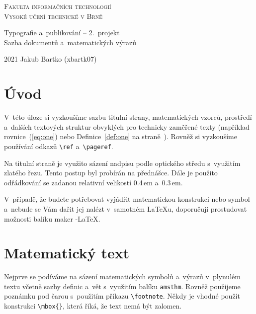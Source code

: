 \documentclass[a4paper, 11pt, twocolumn]{article}
\begin{document}
\begin{titlepage}

\begin{center}
\Huge
\textsc{Fakulta informačních technologií \\
Vysoké učení technické v Brně} \\

\LARGE
Typografie a~publikování -- 2.~projekt \\
Sazba dokumentů a~matematických výrazů \\
\end{center}

{\Large 2021 \hfill
Jakub Bartko (xbartk07)}
\end{titlepage}

\section*{Úvod}
V~této úloze si vyzkoušíme sazbu titulní strany, matematických vzorců, prostředí a~dalších textových struktur obvyklých pro technicky zaměřené texty (například rovnice~(\ref{eq:one}) nebo Definice~\ref{def:one} na straně~\pageref{def:one}). Rovněž si vyzkoušíme používání odkazů \verb|\ref| a~\verb|\pageref|.

Na titulní straně je využito sázení nadpisu podle optického středu s~využitím zlatého řezu. Tento postup byl probírán na přednášce. Dále je použito odřádkování se zadanou relativní velikostí 0.4\,em a~0.3\,em.

V~případě, že budete potřebovat vyjádřit matematickou konstrukci nebo symbol a~nebude se Vám dařit jej nalézt v~samotném \LaTeX u, doporučuji prostudovat možnosti balíku maker \AmS-\LaTeX.

\section{Matematický text}
Nejprve se podíváme na sázení matematických symbolů a~výrazů v~plynulém textu včetně sazby definic a~vět s~využitím balíku \texttt{amsthm}. Rovněž použijeme poznámku pod čarou s~použitím příkazu \verb|\footnote|. Někdy je vhodné použít konstrukci \verb|\mbox{}|, která říká, že text nemá být zalomen.
\end{document}
